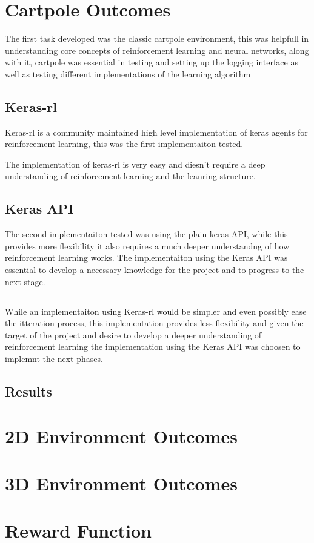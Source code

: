 
\section{Cartpole Outcomes}
The first task developed was the classic cartpole environment,
this was helpfull in understanding core concepts of reinforcement learning and neural networks, along with it,
cartpole was essential in testing and setting up the logging interface as well as testing different implementations of the learning algorithm 
\subsection*{Keras-rl}
Keras-rl is a community maintained high level implementation of keras agents for reinforcement learning, this was the first implementaiton tested. 



The implementation of keras-rl is very easy and diesn't require a deep understanding of reinforcement learning and the leanring structure.
\subsection*{Keras API}
The second implementaiton tested was using the plain keras API, while this provides more flexibility it also requires a much deeper understandng of how reinforcement learning works.
The implementaiton using the Keras API was essential to develop a necessary knowledge for the project and to progress to the next stage.
\subsection*{}

While an implementaiton using Keras-rl would be simpler and even possibly ease the itteration process, this implementation provides less flexibility and given the target of the project and 
desire to develop a deeper understanding of reinforcement learning the implementation using the Keras API was choosen to implemnt the next phases.

\subsection*{Results}


\section{2D Environment Outcomes}

\section{3D Environment Outcomes}

\section{Reward Function}


